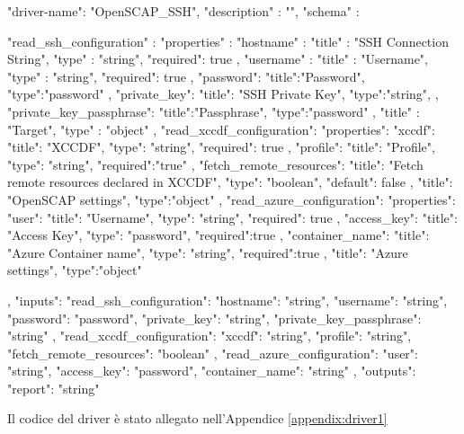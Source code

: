 \documentclass[../main.tex]{subfiles}
\begin{document}
\begin{js}
{
  "driver-name": "OpenSCAP_SSH",
  "description" : "",
  "schema" : {
        "read_ssh_configuration" : {
            "properties" : {
                "hostname" : {
                    "title" : "SSH Connection String",
                    "type" : "string",
                    "required": true
                },
                "username" : {
                    "title" : "Username",
                    "type" : "string",
                    "required": true
                },
                "password": {
                    "title":"Password",
                    "type":"password"
                },
                "private_key": {
                    "title": "SSH Private Key",
                    "type":"string",
                },
                "private_key_passphrase": {
                    "title":"Passphrase",
                    "type":"password"
                }
            },
            "title" : "Target",
            "type" : "object"
        },
        "read_xccdf_configuration":{
            "properties": {
                "xccdf": {
                    "title": "XCCDF",
                    "type": "string",
                    "required": true
                },
                "profile": {
                    "title": "Profile",
                    "type": "string",
                    "required":"true"
                },
                "fetch_remote_resources": {
                    "title": "Fetch remote resources declared in XCCDF",
                    "type": "boolean",
                    "default": false
                }
            },
            "title": "OpenSCAP settings",
            "type":"object"
        },
        "read_azure_configuration":{
            "properties": {
                "user": {
                    "title": "Username",
                    "type": "string",
                    "required": true
                },
                "access_key": {
                    "title": "Access Key",
                    "type": "password",
                    "required":true
                },
                "container_name": {
                    "title": "Azure Container name",
                    "type": "string",
                    "required":true
                }
            },
            "title": "Azure settings",
            "type":"object"
        }

    },
    "inputs": {
        "read_ssh_configuration": {
            "hostname": "string",
            "username": "string",
            "password": "password",
            "private_key": "string",
            "private_key_passphrase": "string"
        },
        "read_xccdf_configuration": {
            "xccdf": "string",
            "profile": "string",
            "fetch_remote_resources": "boolean"
        },
        "read_azure_configuration": {
            "user": "string",
            "access_key": "password",
            "container_name": "string"
        }
    },
    "outputs": {
        "report": "string"
    }
}
\end{js}
Il codice del driver è stato allegato nell'Appendice \ref{appendix:driver1}
\end{document}
